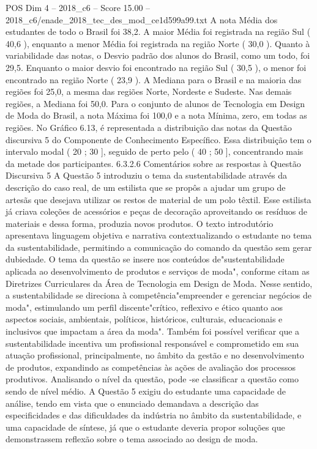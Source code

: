 \begin{textsample}{POS Dim 4 – 2018\_c6 – Score 15.00 – 2018\_c6/enade\_2018\_tec\_des\_mod\_ce1d599a99.txt}
A nota Média dos estudantes de todo o Brasil foi 38,2.
A maior Média foi registrada na região Sul ( 40,6 ), enquanto a menor Média foi registrada na região Norte ( 30,0 ).
Quanto à variabilidade das notas, o Desvio padrão dos alunos do Brasil, como um todo, foi 29,5.
Enquanto o maior desvio foi encontrado na região Sul ( 30,5 ), o menor foi encontrado na região Norte ( 23,9 ).
A Mediana para o Brasil e na maioria das regiões foi 25,0, a mesma das regiões Norte, Nordeste e Sudeste.
Nas demais regiões, a Mediana foi 50,0.
Para o conjunto de alunos de Tecnologia em Design de Moda do Brasil, a nota Máxima foi 100,0 e a nota Mínima, zero, em todas as regiões.
No Gráfico 6.13, é representada a distribuição das notas da Questão discursiva 5 do Componente de Conhecimento Específico.
Essa distribuição tem o intervalo modal ( 20 ; 30 ], seguido de perto pelo ( 40 ; 50 ], concentrando mais da metade dos participantes. 6.3.2.6 Comentários sobre as respostas à Questão Discursiva 5 A Questão 5 introduziu o tema da sustentabilidade através da descrição do caso real, de um estilista que se propôs a ajudar um grupo de artesãs que desejava utilizar os restos de material de um polo têxtil.
Esse estilista já criava coleções de acessórios e peças de decoração aproveitando os resíduos de materiais e dessa forma, produzia novos produtos.
O texto introdutório apresentava linguagem objetiva e narrativa contextualizando o estudante no tema da sustentabilidade, permitindo a comunicação do comando da questão sem gerar dubiedade.
O tema da questão se insere nos conteúdos de"sustentabilidade aplicada ao desenvolvimento de produtos e serviços de moda", conforme citam as Diretrizes Curriculares da Área de Tecnologia em Design de Moda.
Nesse sentido, a sustentabilidade se direciona à competência"empreender e gerenciar negócios de moda", estimulando um perfil discente"crítico, reflexivo e ético quanto aos aspectos sociais, ambientais, políticos, históricos, culturais, educacionais e inclusivos que impactam a área da moda".
Também foi possível verificar que a sustentabilidade incentiva um profissional responsável e comprometido em sua atuação profissional, principalmente, no âmbito da gestão e no desenvolvimento de produtos, expandindo as competências às ações de avaliação dos processos produtivos.
Analisando o nível da questão, pode -se classificar a questão como sendo de nível médio.
A Questão 5 exigiu do estudante uma capacidade de análise, tendo em vista que o enunciado demandava a descrição das especificidades e das dificuldades da indústria no âmbito da sustentabilidade, e uma capacidade de síntese, já que o estudante deveria propor soluções que demonstrassem reflexão sobre o tema associado ao design de moda.

\end{textsample}
